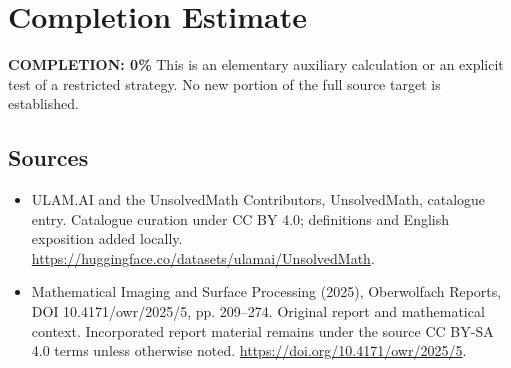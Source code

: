 \documentclass[11pt]{article}
\begin{document}
\section{Completion Estimate}
\noindent\textbf{COMPLETION: 0\%}
This is an elementary auxiliary calculation or an explicit test of a restricted strategy. No new portion of the full source target is established.

\subsection{Sources}
\begin{itemize}
\item[\hypertarget{source:statement:1}{S1}] ULAM.AI and the UnsolvedMath Contributors, UnsolvedMath, catalogue entry. Catalogue curation under CC BY 4.0; definitions and English exposition added locally.
\url{https://huggingface.co/datasets/ulamai/UnsolvedMath}.
\item[\hypertarget{source:statement:2}{S2}] Mathematical Imaging and Surface Processing (2025), Oberwolfach Reports, DOI 10.4171/owr/2025/5, pp. 209--274. Original report and mathematical context. Incorporated report material remains under the source CC BY-SA 4.0 terms unless otherwise noted.
\url{https://doi.org/10.4171/owr/2025/5}.
\end{itemize}
\label{end:statement}
\end{document}
